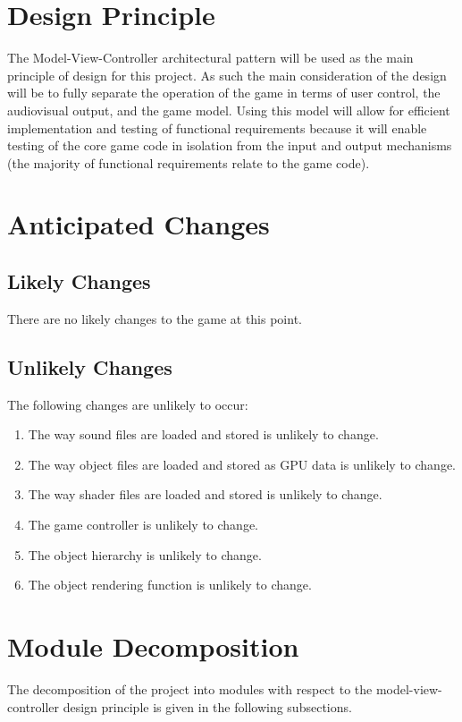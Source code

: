 \documentclass[12pt, titlepage]{article}
\begin{document}
\section{Design Principle}
The Model-View-Controller architectural pattern will be used as the main principle of design for this project.  As such the main consideration of the design will be to fully separate the operation of the game in terms of user control, the audiovisual output, and the game model.  Using this model will allow for efficient implementation and testing of functional requirements because it will enable testing of the core game code in isolation from the input and output mechanisms (the majority of functional requirements relate to the game code).



\section{Anticipated Changes}
\subsection{Likely Changes}
There are no likely changes to the game at this point.

\subsection{Unlikely Changes}
The following changes are unlikely to occur:
\begin{enumerate}[label=UC\arabic*]
  \item The way sound files are loaded and stored is unlikely to change.
  \item The way object files are loaded and stored as GPU data is unlikely to change.
  \item The way shader files are loaded and stored is unlikely to change.
  \item The game controller is unlikely to change.
  \item The object hierarchy is unlikely to change.
  \item The object rendering function is unlikely to change.
\end{enumerate}

\section{Module Decomposition}
The decomposition of the project into modules with respect to the model-view-controller design principle is given in the following subsections.
\end{document}
